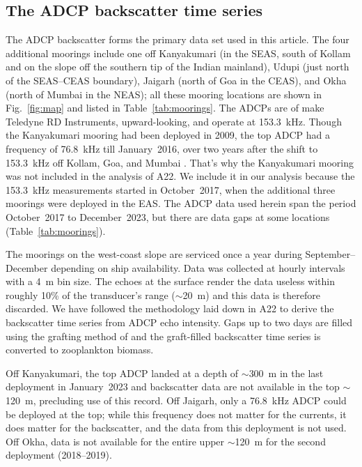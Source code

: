 \documentclass[authoryear,review,11pt]{elsarticle}
\begin{document}
\subsection{The ADCP backscatter time series}
\label{sec:data.bs}

The ADCP backscatter forms the primary data set used in this article.  The four additional moorings include one off Kanyakumari (in the SEAS, south of Kollam and on the slope off the southern tip of the Indian mainland), Udupi (just north of the SEAS--CEAS boundary), Jaigarh (north of Goa in the CEAS), and Okha (north of Mumbai in the NEAS); all these mooring locations are shown in Fig.~\ref{fig:map} and listed in Table~\ref{tab:moorings}.  The ADCPs are of make Teledyne RD Instruments, upward-looking, and operate at 153.3~kHz.  Though the Kanyakumari mooring had been deployed in 2009, the top ADCP had a frequency of 76.8~kHz till January~2016, over two years after the shift to 153.3~kHz off Kollam, Goa, and Mumbai  \citep{chaudhuri2020observed}.  That's why the Kanyakumari mooring was not included in the analysis of A22.  We include it in our analysis because the 153.3~kHz measurements started in October~2017, when the additional three moorings were deployed in the EAS. The ADCP data used herein span the period October~2017 to December~2023, but there are data gaps at some locations (Table~\ref{tab:moorings}). 

The moorings on the west-coast slope are serviced once a year during September--December depending on ship availability. Data was collected at hourly intervals with a 4~m bin size. The echoes at the surface render the data useless within roughly 10\% of the transducer's range ($\sim$20~m) and this data is therefore discarded.  We have followed the methodology laid down in A22 to derive the backscatter time series from ADCP echo intensity. Gaps up to two days are filled using the grafting method of \citet{mukhopadhyay2017st} and the graft-filled backscatter time series is converted to zooplankton biomass.

Off Kanyakumari, the top ADCP landed at a depth of $\sim$300~m in the last deployment in January~2023 and backscatter data are not available in the top $\sim$120~m, precluding use of this record.  Off Jaigarh, only a 76.8~kHz ADCP could be deployed at the top; while this frequency does not matter for the currents, it does matter for the backscatter, and the data from this deployment is not used. Off Okha, data is not available for the entire upper $\sim$120~m for the
second deployment (2018--2019).
\end{document}

